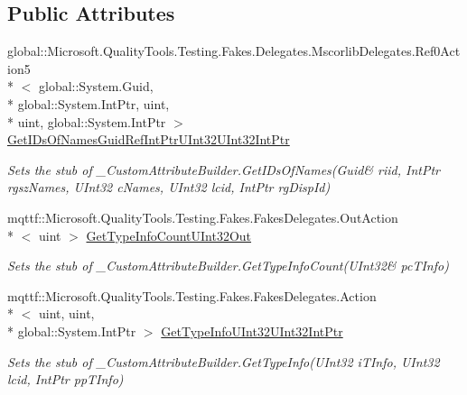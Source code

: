\subsection*{Public Attributes}
\begin{DoxyCompactItemize}
\item 
global\-::\-Microsoft.\-Quality\-Tools.\-Testing.\-Fakes.\-Delegates.\-Mscorlib\-Delegates.\-Ref0\-Action5\\*
$<$ global\-::\-System.\-Guid, \\*
global\-::\-System.\-Int\-Ptr, uint, \\*
uint, global\-::\-System.\-Int\-Ptr $>$ \hyperlink{class_system_1_1_runtime_1_1_interop_services_1_1_fakes_1_1_stub___custom_attribute_builder_ada481a56c17e85f68907098a4de2083b}{Get\-I\-Ds\-Of\-Names\-Guid\-Ref\-Int\-Ptr\-U\-Int32\-U\-Int32\-Int\-Ptr}
\begin{DoxyCompactList}\small\item\em Sets the stub of \-\_\-\-Custom\-Attribute\-Builder.\-Get\-I\-Ds\-Of\-Names(Guid\& riid, Int\-Ptr rgsz\-Names, U\-Int32 c\-Names, U\-Int32 lcid, Int\-Ptr rg\-Disp\-Id)\end{DoxyCompactList}\item 
mqttf\-::\-Microsoft.\-Quality\-Tools.\-Testing.\-Fakes.\-Fakes\-Delegates.\-Out\-Action\\*
$<$ uint $>$ \hyperlink{class_system_1_1_runtime_1_1_interop_services_1_1_fakes_1_1_stub___custom_attribute_builder_a25485f6000203eb7505a7ea200972f63}{Get\-Type\-Info\-Count\-U\-Int32\-Out}
\begin{DoxyCompactList}\small\item\em Sets the stub of \-\_\-\-Custom\-Attribute\-Builder.\-Get\-Type\-Info\-Count(U\-Int32\& pc\-T\-Info)\end{DoxyCompactList}\item 
mqttf\-::\-Microsoft.\-Quality\-Tools.\-Testing.\-Fakes.\-Fakes\-Delegates.\-Action\\*
$<$ uint, uint, \\*
global\-::\-System.\-Int\-Ptr $>$ \hyperlink{class_system_1_1_runtime_1_1_interop_services_1_1_fakes_1_1_stub___custom_attribute_builder_aea2e090a98400b5dfa3bffc2c2189530}{Get\-Type\-Info\-U\-Int32\-U\-Int32\-Int\-Ptr}
\begin{DoxyCompactList}\small\item\em Sets the stub of \-\_\-\-Custom\-Attribute\-Builder.\-Get\-Type\-Info(\-U\-Int32 i\-T\-Info, U\-Int32 lcid, Int\-Ptr pp\-T\-Info)\end{DoxyCompactList}\item 

\end{DoxyCompactItemize}

